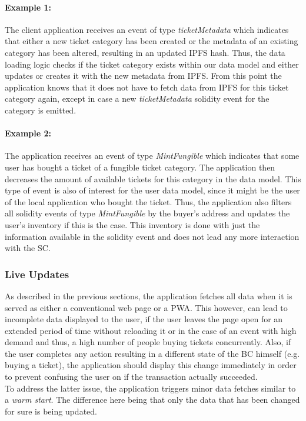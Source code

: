 \paragraph{Example 1:} The client application receives an event of type \textit{ticketMetadata} which indicates that either a new ticket category has been created or the metadata of an existing category has been altered, resulting in an updated IPFS hash. Thus, the data loading logic checks if the ticket category exists within our data model and either updates or creates it with the new metadata from IPFS. From this point the application knows that it does not have to fetch data from IPFS for this ticket category again, except in case a new \textit{ticketMetadata} solidity event for the category is emitted. 

\paragraph{Example 2:} The application receives an event of type \textit{MintFungible} which indicates that some user has bought a ticket of a fungible ticket category. The application then decreases the amount of available tickets for this category in the data model. This type of event is also of interest for the user data model, since it might be the user of the local application who bought the ticket. Thus, the application also filters all solidity events of type \textit{MintFungible} by the buyer's address and updates the user's inventory if this is the case. This inventory is done with just the information available in the solidity event and does not lead any more interaction with the SC.

\subsubsection{Live Updates}

As described in the previous sections, the application fetches all data when it is served as either a conventional web page or a PWA. This however, can lead to incomplete data displayed to the user, if the user leaves the page open for an extended period of time without reloading it or in the case of an event with high demand and thus, a high number of people buying tickets concurrently. Also, if the user completes any action resulting in a different state of the BC himself (e.g. buying a ticket), the application should display this change immediately in order to prevent confusing the user on if the transaction actually succeeded. 
\\
To address the latter issue, the application triggers minor data fetches similar to a \textit{warm start}. The difference here being that only the data that has been changed for sure is being updated.

